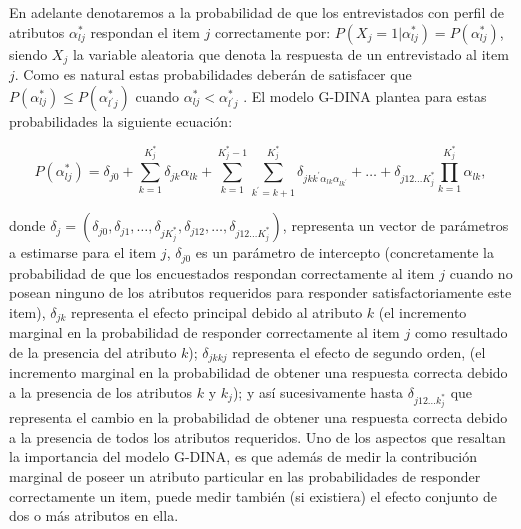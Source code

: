 				En adelante denotaremos a la probabilidad de que los entrevistados con perfil de atributos  $\alpha_{l j}^{*}$ respondan el item $j$ correctamente por:
				$P\left(X_{j}=1 | \alpha_{l j}^{*}\right)=P\left(\alpha_{l j}^{*}\right)$, siendo $X_{j}$ la variable aleatoria que denota la respuesta de un entrevistado al item $j$. Como es natural estas probabilidades deber\'{a}n de satisfacer que $P\left(\alpha_{l j}^{*}\right) \leq P\left(\alpha_{l^{\prime} j}^{*}\right)$ cuando $\alpha_{l j}^{*}<\alpha_{l^{\prime} j}^{*}$ . El modelo G-DINA plantea para estas probabilidades la siguiente ecuaci\'{o}n:
				
				\begin{equation}
					P\left(\alpha_{l j}^{*}\right)=\delta_{j 0}+\sum_{k=1}^{K_{j}^{*}} \delta_{j k} \alpha_{l k}+\sum_{k=1}^{K_{j}^{*}-1} \sum_{k^{\prime}=k+1}^{K_{j}^{*}} \delta_{j k k^{\prime} \alpha_{l k} \alpha_{l k^{\prime}}}+\ldots+\delta_{j 12 \ldots K_{j}^{*}} \prod_{k=1}^{K_{j}^{*}} \alpha_{l k}, \label{2.36}
				\end{equation}
				
				donde $\delta_{j}=\left(\delta_{j 0}, \delta_{j 1}, \ldots, \delta_{j K_{j}^{*}}, \delta_{j 12}, \ldots, \delta_{j 12 \ldots K_{j}^{*}}\right)$, representa un vector de par\'{a}metros a estimarse para el item $j$, $\delta_{j0}$ es un par\'{a}metro de intercepto (concretamente la probabilidad de que los encuestados respondan correctamente al item $j$ cuando no posean ninguno de los atributos requeridos para responder satisfactoriamente este item), ${ \delta  }_{ jk }$ representa el efecto principal debido al atributo $k$ (el incremento marginal en la probabilidad de responder correctamente al item $j$ como resultado de la presencia del atributo $k$); ${\delta}_{jkkj}$ representa el efecto de segundo orden, (el incremento marginal en la probabilidad de obtener una respuesta correcta debido a la presencia de los atributos $k$ y ${ k }_{ j }$); y as\'{i} sucesivamente hasta ${ \delta  }_{ j12\ldots { { k }_{ j }^{ * } } }$ que representa el cambio en la probabilidad de obtener una respuesta correcta debido a la presencia de todos los atributos requeridos.
				Uno de los aspectos que resaltan la importancia del modelo G-DINA, es que adem\'{a}s de medir la contribuci\'{o}n marginal de poseer un atributo particular en las probabilidades de responder correctamente un item, puede medir tambi\'{e}n (si existiera) el efecto conjunto de dos o m\'{a}s atributos en ella.
				
				     
				
				
				
				
		
		
